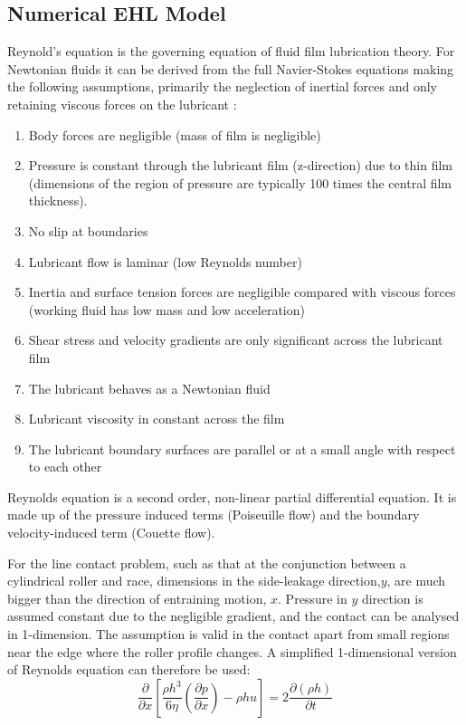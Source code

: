 \subsection{Numerical EHL Model}

Reynold’s equation \cite{Reynolds1886} is the governing equation of fluid film lubrication theory. For Newtonian fluids it can be derived from the full Navier-Stokes equations making the following assumptions, primarily the neglection of inertial forces and only retaining viscous forces on the lubricant \cite{Gohar1988}:
\begin{enumerate} %
	\item Body forces are negligible (mass of film is negligible)
	\item Pressure is constant through the lubricant film (z-direction) due to thin film (dimensions of the region of pressure are typically 100 times the central film thickness).
	\item No slip at boundaries
	\item Lubricant flow is laminar (low Reynolds number)
	\item Inertia and surface tension forces are negligible compared with viscous forces (working fluid has low mass and low acceleration)
	\item Shear stress and velocity gradients are only significant across the lubricant film %
	\item The lubricant behaves as a Newtonian fluid
	\item Lubricant viscosity in constant across the film %
	\item The lubricant boundary surfaces are parallel or at a small angle with respect to each other
\end{enumerate}

Reynolds equation is a second order, non-linear partial differential equation. It is made up of the pressure induced terms (Poiseuille flow) and the boundary velocity-induced term (Couette flow). 

For the line contact problem, such as that at the conjunction between a cylindrical roller and race, dimensions in the side-leakage direction,$y$, are much bigger than the direction of entraining motion, $x$. Pressure in $y$ direction is assumed constant due to the negligible gradient, and the contact can be analysed in 1-dimension. The assumption is valid in the contact apart from small regions near the edge where the roller profile changes. A simplified 1-dimensional version of Reynolds equation can therefore be used:
\begin{equation}\label{eq1.1}
	\frac{\partial}{\partial x}\left[\frac{\rho h^{3}}{6 \eta}\left(\frac{\partial p}{\partial x}\right)-\rho h u\right]=2 \frac{\partial(\rho h)}{\partial t}
\end{equation}

